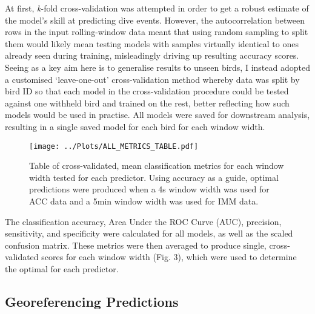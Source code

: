 \documentclass[11pt]{article}
\begin{document}
    At first, \emph{k}-fold cross-validation was attempted in order to get a robust estimate of the model’s skill at predicting dive events. However, the autocorrelation between rows in the input rolling-window data meant that using random sampling to split them would likely mean testing models with samples virtually identical to ones already seen during training, misleadingly driving up resulting accuracy scores. Seeing as a key aim here is to generalise results to unseen birds, I instead adopted a customised ‘leave-one-out’ cross-validation method whereby data was split by bird ID so that each model in the cross-validation procedure could be tested against one withheld bird and trained on the rest, better reflecting how such models would be used in practise. All models were saved for downstream analysis, resulting in a single saved model for each bird for each window width.
    
    \begin{figure}[t!]
	    \centering\texttt{[image: ../Plots/ALL\_METRICS\_TABLE.pdf]}
	    \caption{Table of cross-validated, mean classification metrics for each window width tested for each predictor. Using accuracy as a guide, optimal predictions were produced when a 4s window width was used for ACC data and a 5min window width was used for IMM data.}
    \end{figure}
    
    The classification accuracy, Area Under the ROC Curve (AUC), precision, sensitivity, and specificity were calculated for all models, as well as the scaled confusion matrix. These metrics were then averaged to produce single, cross-validated scores for each window width (Fig. 3), which were used to determine the optimal for each predictor. 
    
    \subsection{Georeferencing Predictions}
    
\end{document}
